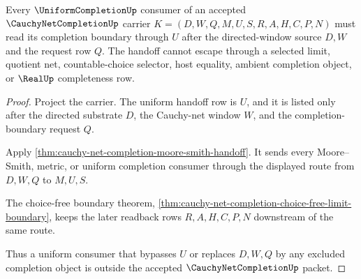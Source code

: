 \begin{theorem}
\label{thm:cauchy-net-completion-uniform-handoff-nonescape}
Every $\UniformCompletionUp$ consumer of an accepted $\CauchyNetCompletionUp$ carrier $K=(D,W,Q,M,U,S,R,A,H,C,P,N)$ must read its completion boundary through $U$ after the directed-window source $D,W$ and the request row $Q$. The handoff cannot escape through a selected limit, quotient net, countable-choice selector, host equality, ambient completion object, or $\RealUp$ completeness row.
\end{theorem}
\begin{proof}
Project the carrier. The uniform handoff row is $U$, and it is listed only after the directed substrate $D$, the Cauchy-net window $W$, and the completion-boundary request $Q$.

Apply \autoref{thm:cauchy-net-completion-moore-smith-handoff}. It sends every Moore--Smith, metric, or uniform completion consumer through the displayed route from $D,W,Q$ to $M,U,S$.

The choice-free boundary theorem, \autoref{thm:cauchy-net-completion-choice-free-limit-boundary}, keeps the later readback rows $R,A,H,C,P,N$ downstream of the same route.

Thus a uniform consumer that bypasses $U$ or replaces $D,W,Q$ by any excluded completion object is outside the accepted $\CauchyNetCompletionUp$ packet.
\end{proof}

